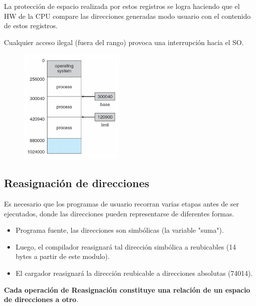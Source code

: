 \documentclass{templateNote}
\begin{document}
La protección de espacio realizada por estos registros se logra haciendo que el HW de la CPU compare las direcciones generadas modo usuario con el contenido de estos registros.

Cualquier acceso ilegal (fuera del rango) provoca una interrupción hacia el SO.

\begin{figure}[H]
    \centering
    \includegraphics[width=0.45\textwidth]{img/baseylimite.png}
\end{figure}

\subsection{Reasignación de direcciones}
Es necesario que los programas de usuario recorran varias etapas antes de ser ejecutados, donde las direcciones pueden representarse de diferentes formas.
\begin{itemize}
    \item Programa fuente, las direcciones son simbólicas (la variable "suma").
    \item Luego, el compilador reasignará tal dirección simbólica a reubicables (14 bytes a partir de este modulo).
    \item El cargador reasignará la dirección reubicable a direcciones absolutas (74014).
\end{itemize}
\textbf{Cada operación de Reasignación constituye una relación de un espacio de direcciones a otro}.
\end{document}
